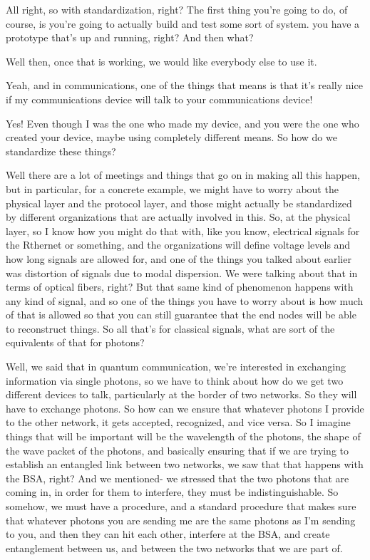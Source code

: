 \rrr All right, so with standardization, right? The first thing you're going to do, of course, is you're going to actually build and test some sort of system. you have a prototype that's up and running, right? And then what?

\mmm Well then, once that is working, we would like everybody else to use it.

\rrr Yeah, and in communications, one of the things that means is that it's really nice if my communications device will talk to your communications device!

\mmm Yes! Even though I was the one who made my device, and you were the one who created your device, maybe using completely different means. So how do we standardize these things?

\rrr Well there are a lot of meetings and things that go on in making all this happen, but in particular, for a concrete example, we might have to worry about the physical layer and the protocol layer, and those might actually be standardized by different organizations that are actually involved in this. So, at the physical layer, so I know how you might do that with, like you know, electrical signals for the Rthernet or something, and the organizations will define voltage levels and how long signals are allowed for, and one of the things you talked about earlier was distortion of signals due to modal dispersion. We were talking about that in terms of optical fibers, right? But that same kind of phenomenon happens with any kind of signal, and so one of the things you have to worry about is how much of that is allowed so that you can still guarantee that the end nodes will be able to reconstruct things. So all that's for classical signals, what are sort of the equivalents of that for photons?

\mmm Well, we said that in quantum communication, we're interested in exchanging information via single photons, so we have to think about how do we get two different devices to talk, particularly at the border of two networks. So they will have to exchange photons. So how can we ensure that whatever photons I provide to the other network, it gets accepted, recognized, and vice versa. So I imagine things that will be important will be the wavelength of the photons, the shape of the wave packet of the photons, and basically ensuring that if we are trying to establish an entangled link between two networks, we saw that that happens with the BSA, right? And we mentioned- we stressed that the two photons that are coming in, in order for them to interfere, they must be indistinguishable. So somehow, we must have a procedure, and a standard procedure that makes sure that whatever photons you are sending me are the same photons as I'm sending to you, and then they can hit each other, interfere at the BSA, and create entanglement between us, and between the two networks that we are part of.

